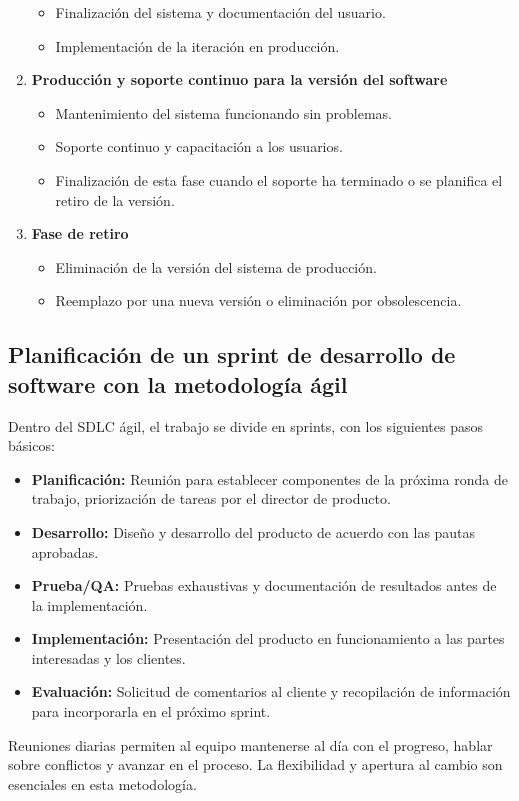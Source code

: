 \documentclass{article}
\begin{document}
\begin{enumerate}
\begin{itemize}
        \item Finalización del sistema y documentación del usuario.
        \item Implementación de la iteración en producción.
    \end{itemize}
    \item \textbf{Producción y soporte continuo para la versión del software}
    \begin{itemize}
        \item Mantenimiento del sistema funcionando sin problemas.
        \item Soporte continuo y capacitación a los usuarios.
        \item Finalización de esta fase cuando el soporte ha terminado o se planifica el retiro de la versión.
    \end{itemize}
    \item \textbf{Fase de retiro}
    \begin{itemize}
        \item Eliminación de la versión del sistema de producción.
        \item Reemplazo por una nueva versión o eliminación por obsolescencia.
    \end{itemize}
\end{enumerate}

\subsection{Planificación de un sprint de desarrollo de software con la metodología ágil}
Dentro del SDLC ágil, el trabajo se divide en sprints, con los siguientes pasos básicos:
\begin{itemize}
    \item \textbf{Planificación:} Reunión para establecer componentes de la próxima ronda de trabajo, priorización de tareas por el director de producto.
    \item \textbf{Desarrollo:} Diseño y desarrollo del producto de acuerdo con las pautas aprobadas.
    \item \textbf{Prueba/QA:} Pruebas exhaustivas y documentación de resultados antes de la implementación.
    \item \textbf{Implementación:} Presentación del producto en funcionamiento a las partes interesadas y los clientes.
    \item \textbf{Evaluación:} Solicitud de comentarios al cliente y recopilación de información para incorporarla en el próximo sprint.
\end{itemize}
Reuniones diarias permiten al equipo mantenerse al día con el progreso, hablar sobre conflictos y avanzar en el proceso. La flexibilidad y apertura al cambio son esenciales en esta metodología.
\end{document}
